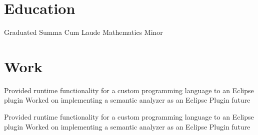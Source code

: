 \documentclass{my_cv}
\begin{document}

\section{Education}
\workitemstwo
{Graduated Summa Cum Laude }
{Mathematics Minor}
 
\section{Work}
\workitemstwo
{Provided runtime functionality for a custom programming language to an Eclipse plugin}
{Worked on implementing a semantic analyzer as an Eclipse Plugin future}

\workitemstwo
{Provided runtime functionality for a custom programming language to an Eclipse plugin}
{Worked on implementing a semantic analyzer as an Eclipse Plugin future}

 
 
\end{document}
